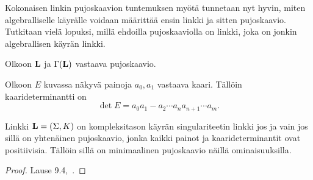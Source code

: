 Kokonaisen linkin pujoskaavion tuntemuksen myötä tunnetaan nyt hyvin, miten algebralliselle käyrälle voidaan määrittää ensin linkki ja sitten pujoskaavio. Tutkitaan vielä lopuksi, millä ehdoilla pujoskaaviolla on linkki, joka on jonkin algebrallisen käyrän linkki.
\begin{maaritelma}[Kaarideterminantti]
    Olkoon $\mathbf{L}$ ja $\Gamma(\mathbf{L})$ vastaava pujoskaavio.
    \begin{center}
    \end{center}
    Olkoon $E$ kuvassa näkyvä painoja $a_0,a_1$ vastaava kaari. Tällöin kaarideterminantti on
    \begin{equation*}
        \det E=a_0a_1-a_2\cdots a_na_{n+1}\cdots a_m.
    \end{equation*}
\end{maaritelma}
\begin{lemma}
    \label{lemma:singulariteettilinkin-ehdot}
    Linkki $\mathbf{L}=(\Sigma,K)$ on kompleksitason käyrän singulariteetin linkki jos ja vain jos sillä on yhtenäinen pujoskaavio, jonka kaikki painot ja kaarideterminantit ovat positiivisia. Tällöin sillä on minimaalinen pujoskaavio näillä ominaisuuksilla.
\end{lemma}
\begin{proof}
    Lause 9.4,~\citep{EN1985}.
\end{proof}